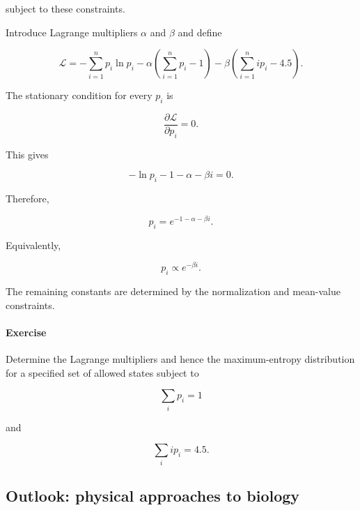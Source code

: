 subject to these constraints.

Introduce Lagrange multipliers $\alpha$ and $\beta$ and define

\begin{equation}
    \mathcal{L}=-\sum_{i=1}^{n}p_i\ln p_i-\alpha\left(\sum_{i=1}^{n}p_i-1\right)-\beta\left(\sum_{i=1}^{n}ip_i-4.5\right).
\end{equation}

The stationary condition for every $p_i$ is

\begin{equation}
    \frac{\partial\mathcal{L}}{\partial p_i}=0.
\end{equation}

This gives

\begin{equation}
    -\ln p_i-1-\alpha-\beta i=0.
\end{equation}

Therefore,

\begin{equation}
    p_i=e^{-1-\alpha-\beta i}.
\end{equation}

Equivalently,

\begin{equation}
    p_i\propto e^{-\beta i}.
\end{equation}

The remaining constants are determined by the normalization and mean-value constraints.

\paragraph{Exercise}

Determine the Lagrange multipliers and hence the maximum-entropy distribution for a specified set of allowed states subject to

\begin{equation}
    \sum_i p_i=1
\end{equation}

and

\begin{equation}
    \sum_i ip_i=4.5.
\end{equation}


\subsection{Outlook: physical approaches to biology}

